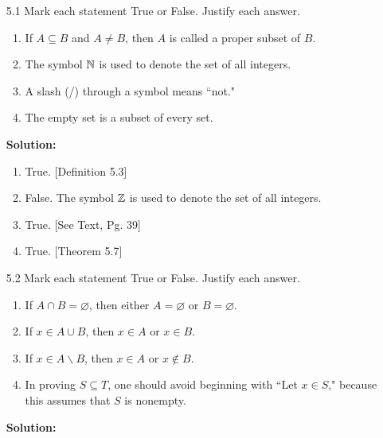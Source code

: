 \begin{enumerate}
   \item[5.1]  Mark each statement True or False. Justify each answer.
               \begin{enumerate}
                  \item If $A \subseteq B$ and $A \neq B$, then $A$ is called a
                        proper subset of $B$.
                  \item The symbol $\mathbb{N}$ is used to denote the set of all
                        integers.
                  \item A slash (/) through a symbol means ``not."
                  \item The empty set is a subset of every set.
               \end{enumerate}
               
      \textbf{Solution:}
      
      \begin{enumerate}
         \item True. [Definition 5.3]
         \item False. The symbol $\mathbb{Z}$ is used to denote the set of all integers.
         \item True. [See Text, Pg. 39]
         \item True. [Theorem 5.7]
      \end{enumerate}
   \item[5.2]  Mark each statement True or False. Justify each answer.
               \begin{enumerate}
                  \item If $A \cap B = \varnothing$, then either  
                        $A = \varnothing$ or $B = \varnothing$.
                  \item If $x \in A \cup B$, then $x \in A$ or $x \in B$.
                  \item If $x \in A{\backslash}B$, then $x \in A$ or
                        $x \notin B$.
                  \item In proving $S \subseteq T$, one should avoid beginning
                        with ``Let $x \in S$," because this assumes that $S$ is
                        nonempty.
               \end{enumerate}
               
      \textbf{Solution:}
      

\end{enumerate}
